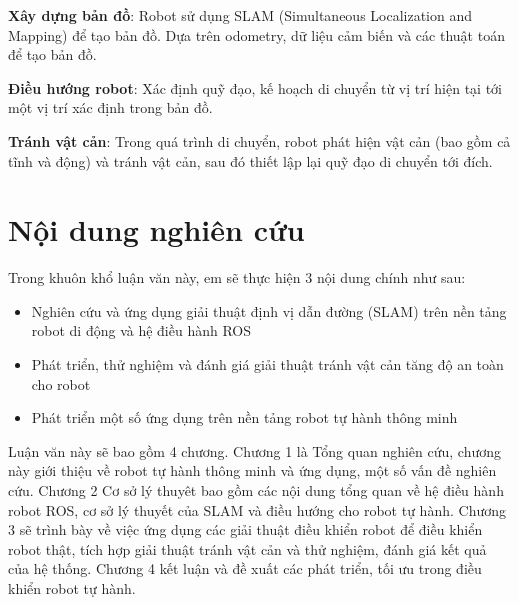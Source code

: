 \textbf{Xây dựng bản đồ}: Robot sử dụng SLAM (Simultaneous Localization and Mapping) để tạo bản đồ. Dựa trên odometry, dữ liệu cảm biến và các thuật toán để tạo bản đồ.

\textbf{Điều hướng robot}: Xác định quỹ đạo, kế hoạch di chuyển từ vị trí hiện tại tới một vị trí xác định trong bản đồ.

\textbf{Tránh vật cản}: Trong quá trình di chuyển, robot phát hiện vật cản (bao gồm cả tĩnh và động) và tránh vật cản, sau đó thiết lập lại quỹ đạo di chuyển tới đích.


\section{Nội dung nghiên cứu}

Trong khuôn khổ luận văn này, em sẽ thực hiện 3 nội dung chính như sau:
\begin{itemize}
	\item Nghiên cứu và ứng dụng giải thuật định vị dẫn đường (SLAM) trên nền tảng robot di động và hệ điều hành ROS
	\item Phát triển, thử nghiệm và đánh giá giải thuật tránh vật cản tăng độ an toàn cho robot
	\item Phát triển một số ứng dụng trên nền tảng robot tự hành thông minh
\end{itemize}

Luận văn này sẽ bao gồm 4 chương. Chương 1 là Tổng quan nghiên cứu, chương này giới thiệu về robot tự hành thông minh và ứng dụng, một số vấn đề nghiên cứu. Chương 2 Cơ sở lý thuyêt bao gồm các nội dung tổng quan về hệ điều hành robot ROS, cơ sở lý thuyết của SLAM và điều hướng cho robot tự hành. Chương 3 sẽ trình bày về việc ứng dụng các giải thuật điều khiển robot để điều khiển robot thật, tích hợp giải thuật tránh vật cản và thử nghiệm, đánh giá kết quả của hệ thống. Chương 4 kết luận và đề xuất các phát triển, tối ưu trong điều khiển robot tự hành. 

